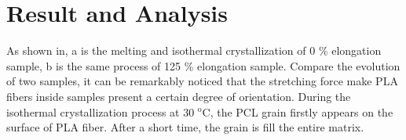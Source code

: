 \documentclass{Head}
\begin{document}


\label{sec:experiment}
\section{Result and Analysis} %
As shown in, a is the melting and isothermal crystallization of 0 \% elongation sample, b is the same process of 125 \% elongation sample. Compare the evolution of two samples, it can be remarkably noticed that the stretching force make PLA fibers inside samples  present a certain degree of orientation. During the isothermal crystallization process at 30 $\mathrm{^o C}$, the PCL grain firstly appears on the surface of PLA fiber. After a short time, the grain is fill the entire matrix.
\end{document}
